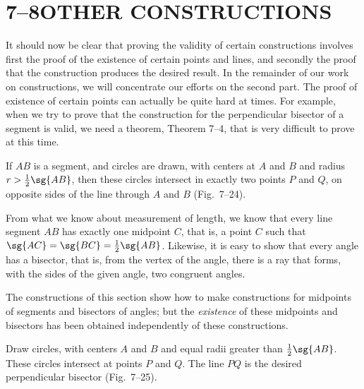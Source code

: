 \documentclass[11pt]{book}
\theoremstyle{bkplain}
\theoremstyle{XIplainnote}
\theoremstyle{bkplain}
\theoremstyle{bkplain}
\begin{document}
\section*{7--8\quad OTHER CONSTRUCTIONS}

It should now be clear that proving the validity of certain constructions
involves first the proof of the existence of certain points and lines, and
secondly the proof that the construction produces the desired result. In the
remainder of our work on constructions, we will concentrate our efforts on the
second part. The proof of existence of certain points can actually be quite
hard at times. For example, when we try to prove that the construction for the
perpendicular bisector of a segment is valid, we need a theorem, Theorem 7--4,
that is very difficult to prove at this time.

\begin{theorem}
If $AB$ is a segment, and circles are drawn, with centers at $A$ and $B$ and
radius $r > \frac{1}{2}\sg{AB}$, then these circles intersect in exactly two
points $P$ and $Q$, on opposite sides of the line through $A$ and $B$
(Fig.~7--24).
\end{theorem}

\begin{remark}
From what we know about measurement of length, we know that every line segment
$AB$ has exactly one midpoint $C$, that is, a point $C$ such that
$\sg{AC} = \sg{BC} = \frac{1}{2}\sg{AB}$. Likewise, it is easy to show that
every angle has a bisector, that is, from the vertex of the angle, there is a
ray that forms, with the sides of the given angle, two congruent angles.
\end{remark}

\FIGVIITWENTYFOURTWENTYFIVE

The constructions of this section show how to make \RC{} constructions for
midpoints of segments and bisectors of angles; but the \emph{existence} of
these midpoints and bisectors has been obtained independently of these
constructions.

\begin{construction}
Draw circles, with centers $A$ and $B$ and equal radii greater than
$\frac{1}{2}\sg{AB}$. These circles intersect at points $P$ and $Q$. The line
$PQ$ is the desired perpendicular bisector (Fig.~7--25).
\end{construction}
\end{document}
